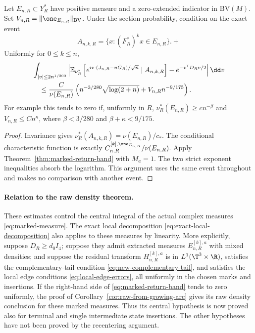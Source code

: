 \begin{corollary}
\label{cor:marked-state-conditioning}
Let $E_{n,R}\subset Y_R^*$ have positive measure and a zero-extended
indicator in $\mathrm{BV}(M)$. Set
$V_{n,R}=\|\one_{E_{n,R}}\|_{\mathrm{BV}}$. Under the section probability,
condition on the exact event
\[
 A_{n,k,R}=\{x:(F_R^*)^kx\in E_{n,R}\}.+\]
Uniformly for $0\le k\le n$,
\begin{align}
 &\int_{|v|\le2n^{1/200}}
 \left|\mathbb E_{\nu_R^*}\left[
 e^{iv\cdot(J_{n,R}-n\bar G_R)/\sqrt n}\mid A_{n,k,R}\right]
          -e^{-v^{\mathsf T}D_Rv/2}\right|\dd v\notag\\
 &\quad\le\frac{C}{\nu(E_{n,R})}
  \left(n^{-3/280}\sqrt{\log(2+n)}+V_{n,R}n^{-9/175}\right).
       \label{eq:marked-conditional-band}
\end{align}
For example this tends to zero if, uniformly in $R$,
$\nu_R^*(E_{n,R})\ge c n^{-\beta}$ and $V_{n,R}\le Cn^\kappa$,
where $\beta<3/280$ and $\beta+\kappa<9/175$.
\end{corollary}
\begin{proof}
Invariance gives $\nu_R^*(A_{n,k,R})=\nu(E_{n,R})/c_*$.
The conditional characteristic function is exactly
$C^{[k],\one_{E_{n,R}}}_{n,R}/\nu(E_{n,R})$. Apply
Theorem~\ref{thm:marked-return-band} with $M_a=1$. The two strict
exponent inequalities absorb the logarithm. This argument uses the
same event throughout and makes no comparison with another event.
\end{proof}

\paragraph{Relation to the raw density theorem.}
These estimates control the central integral of the actual complex
measures \eqref{eq:marked-measure}. The exact local decomposition
\eqref{eq:exact-local-decomposition} also applies to these measures by
linearity. More explicitly, suppose $D_R\ge d_0 I_4$; suppose they admit
extracted measures $E^{[k],a}_{n,R}$ with mixed densities; and suppose
the residual transform $H^{[k],a}_{n,R}$ is in
$L^1(\T^3\times\R)$, satisfies the complementary-tail condition
\eqref{eq:new-complementary-tail}, and satisfies the local edge
conditions \eqref{eq:local-edge-errors}, all uniformly in the chosen
marks and insertions. If the right-hand side of
\eqref{eq:marked-return-band} tends to zero uniformly, the proof of
Corollary~\ref{cor:raw-from-growing-arc} gives its raw density conclusion
for these marked measures. Thus its central hypothesis is now proved
also for terminal and single intermediate state insertions. The other
hypotheses have not been proved by the recentering argument.


